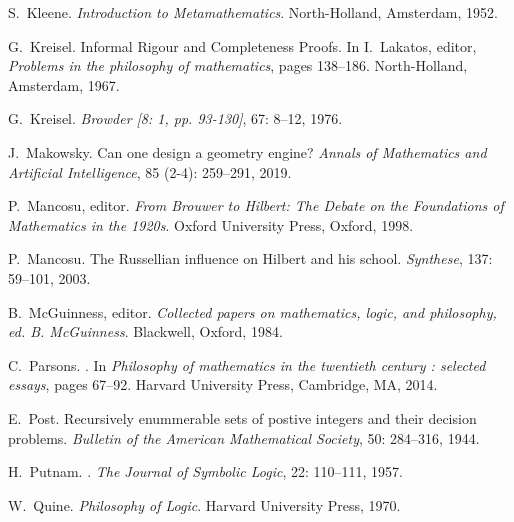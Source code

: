 \documentclass[11pt,fleqn,leqno]{article}
\begin{document}
\begin{thebibliography}{118}
S.~Kleene.
\newblock \emph{Introduction to {M}etamathematics}.
\newblock North-Holland, Amsterdam, 1952.

G.~Kreisel.
\newblock Informal {R}igour and {C}ompleteness {P}roofs.
\newblock In I.~Lakatos, editor, \emph{{Problems in the philosophy of
  mathematics}}, pages 138--186. North-Holland, Amsterdam, 1967.

G.~Kreisel.
\newblock \emph{Browder [8: 1, pp. 93-130]}, 67: 8--12, 1976.

J.~Makowsky.
\newblock Can one design a geometry engine?
\newblock \emph{Annals of Mathematics and Artificial Intelligence}, 85
  (2-4): 259--291, 2019.

P.~Mancosu, editor.
\newblock \emph{From {B}rouwer to {H}ilbert: The Debate on the Foundations of
  Mathematics in the 1920s}.
\newblock Oxford University Press, Oxford, 1998.

P.~Mancosu.
\newblock The {R}ussellian influence on {H}ilbert and his school.
\newblock \emph{Synthese}, 137: 59--101, 2003.

B.~McGuinness, editor.
\newblock \emph{Collected papers on mathematics, logic, and philosophy, ed. B.
  McGuinness}.
\newblock Blackwell, Oxford, 1984.

C.~Parsons.
.
\newblock In \emph{Philosophy of mathematics in the twentieth century :
  selected essays}, pages 67--92. Harvard University Press, Cambridge, MA,
  2014.

E.~Post.
\newblock Recursively enummerable sets of postive integers and their decision
  problems.
\newblock \emph{Bulletin of the American Mathematical Society}, 50:
  284--316, 1944.

H.~Putnam.
.
\newblock \emph{The Journal of Symbolic Logic}, 22: 110--111, 1957.

W.~Quine.
\newblock \emph{Philosophy of Logic}.
\newblock Harvard University Press, 1970.


\end{thebibliography}
\end{document}
